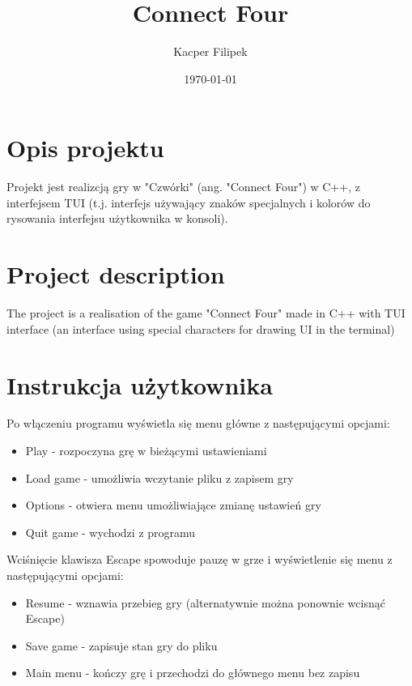 \documentclass{article}
\title{Connect Four}
\author{Kacper Filipek}
\date{\today}
\begin{document}
\selectfont

\maketitle

\newpage

\section{Opis projektu}

Projekt jest realizcją gry w "Czwórki" (ang. "Connect Four") w C++, z interfejsem TUI (t.j. interfejs używający znaków specjalnych i kolorów do rysowania interfejsu użytkownika w konsoli). 

\section{Project description}

The project is a realisation of the game "Connect Four" made in C++ with TUI interface (an interface using special characters for drawing UI in the terminal)

\section{Instrukcja użytkownika}

Po włączeniu programu wyświetla się menu główne z następującymi opcjami:
\begin{itemize}
    \item Play - rozpoczyna grę w bieżącymi ustawieniami
    \item Load game - umożliwia wczytanie pliku z zapisem gry
    \item Options - otwiera menu umożliwiające zmianę ustawień gry
    \item Quit game - wychodzi z programu
\end{itemize}

Wciśnięcie klawisza Escape spowoduje pauzę w grze i wyświetlenie się menu z następującymi opcjami:
\begin{itemize}
    \item Resume - wznawia przebieg gry (alternatywnie można ponownie wcisnąć Escape)
    \item Save game - zapisuje stan gry do pliku
    \item Main menu - kończy grę i przechodzi do głównego menu bez zapisu
\end{itemize}
\end{document}
